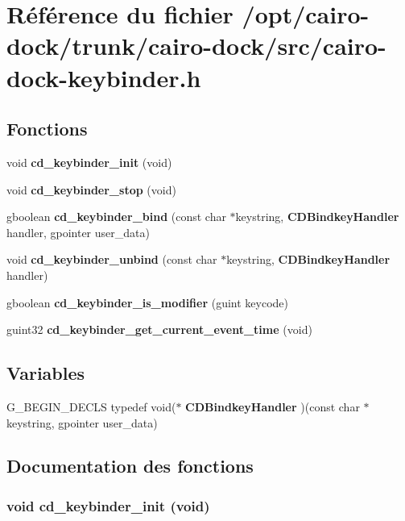 \section{Référence du fichier /opt/cairo-dock/trunk/cairo-dock/src/cairo-dock-keybinder.h}
\label{cairo-dock-keybinder_8h}
\subsection*{Fonctions}
\begin{CompactItemize}
\item 
void {\bf cd\_\-keybinder\_\-init} (void)
\item 
void {\bf cd\_\-keybinder\_\-stop} (void)
\item 
gboolean {\bf cd\_\-keybinder\_\-bind} (const char $\ast$keystring, {\bf CDBindkeyHandler} handler, gpointer user\_\-data)
\item 
void {\bf cd\_\-keybinder\_\-unbind} (const char $\ast$keystring, {\bf CDBindkeyHandler} handler)
\item 
gboolean {\bf cd\_\-keybinder\_\-is\_\-modifier} (guint keycode)
\item 
guint32 {\bf cd\_\-keybinder\_\-get\_\-current\_\-event\_\-time} (void)
\end{CompactItemize}
\subsection*{Variables}
\begin{CompactItemize}
\item 
G\_\-BEGIN\_\-DECLS typedef void($\ast$ {\bf CDBindkeyHandler} )(const char $\ast$keystring, gpointer user\_\-data)
\end{CompactItemize}


\subsection{Documentation des fonctions}
\subsubsection{\setlength{\rightskip}{0pt plus 5cm}void cd\_\-keybinder\_\-init (void)}\label{cairo-dock-keybinder_8h_494e123cabfcaef18a110ab4a50b505d}


